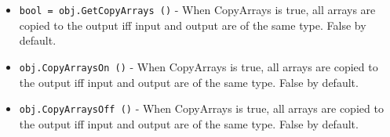 \begin{itemize}
\item  \verb|bool = obj.GetCopyArrays ()| -  When CopyArrays is true, all arrays are copied to the output
 iff input and output are of the same type. False by default.

\item  \verb|obj.CopyArraysOn ()| -  When CopyArrays is true, all arrays are copied to the output
 iff input and output are of the same type. False by default.

\item  \verb|obj.CopyArraysOff ()| -  When CopyArrays is true, all arrays are copied to the output
 iff input and output are of the same type. False by default.

\end{itemize}
